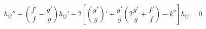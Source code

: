 \begin{equation}
h_{ij}'' +(\frac{f'}{f}-\frac{g'}{g})h_{ij}' -2[(\frac{g'}{g})'+ \frac{g'}{g}(2\frac{g'}{g}+\frac{f'}{f})-k^2]h_{ij}=0
\end{equation}

